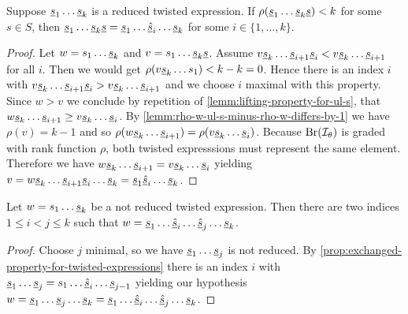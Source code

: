 \begin{prop}
	Suppose $\underline{s}_1 \ldots \underline{s}_k$ is a reduced twisted expression. If $\rho(\underline{s}_1 \ldots \underline{s}_k \underline{s}) < k$ for some $s \in S$, then
	$\underline{s}_1 \ldots \underline{s}_k \underline{s} = \underline{s}_1 \ldots \underline{\hat s}_i \ldots \underline{s}_k$
	for some $i \in \{1,\ldots,k\}$.
	
	\begin{proof}
		Let $w = s_1 \ldots \underline{s}_k$ and $v = s_1 \ldots \underline{s}_k \underline{s}$. Assume $v \underline{s}_k \ldots \underline{s}_{i+1} \underline{s}_i < v \underline{s}_k \ldots \underline{s}_{i+1}$ for all $i$. Then we would get $\rho(v \underline{s}_k \ldots s_1) < k - k = 0$. Hence there is an index $i$ with $v \underline{s}_k \ldots \underline{s}_{i+1} \underline{s}_i > v \underline{s}_k \ldots \underline{s}_{i+1}$ and we choose $i$ maximal with this property. Since $w > v$ we conclude by repetition of \ref{lemm:lifting-property-for-ul-s}, that $w \underline{s}_k \ldots \underline{s}_{i+1} \geq v \underline{s}_k \ldots \underline{s}_i$. By \ref{lemm:rho-w-ul-s-minus-rho-w-differs-by-1} we have $\rho(v) = k - 1$ and so $\rho(w \underline{s}_k \ldots \underline{s}_{i+1}) = \rho(v \underline{s}_k \ldots \underline{s}_i)$. Because $\operatorname{Br}(\mathcal{I}_{\theta})$ is graded with rank function $\rho$, both twisted expresssions must represent the same element. Therefore we have $w \underline{s}_k \ldots \underline{s}_{i+1} = v \underline{s}_k \ldots \underline{s}_i$ yielding $v = w \underline{s}_k \ldots \underline{s}_{i+1} \underline{s}_i \ldots \underline{s}_k = \underline{s}_1 \underline{\hat s}_i \ldots \underline{s}_k$.
	\end{proof}
\end{prop}

\begin{prop}
	Let $w = s_1 \ldots \underline{s}_k$ be a not reduced twisted expression. Then there are two indices $1 \leq i < j \leq k$ such that $w = \underline{s}_1 \ldots \underline{\hat s}_i \ldots \underline{\hat s}_j \ldots \underline{s}_k$.

	\begin{proof}
		Choose $j$ minimal, so we have $\underline{s}_1 \ldots \underline{s}_j$ is not reduced. By \ref{prop:exchanged-property-for-twisted-expressions} there is an index $i$ with $\underline{s}_1 \ldots \underline{s}_j = s_1 \ldots \underline{\hat s}_i \ldots \underline{s}_{j-1}$ yielding our hypothesis $w = \underline{s}_1 \ldots \underline{s}_j \ldots \underline{s}_k = \underline{s}_1 \ldots \underline{\hat s}_i \ldots \underline{\hat s}_j \ldots \underline{s}_k$.
	\end{proof}
\end{prop}

